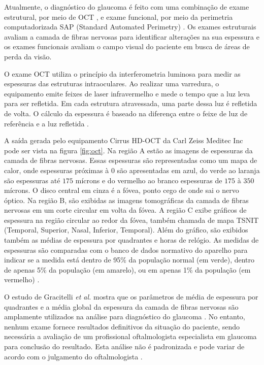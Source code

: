 \documentclass[conference]{IEEEtran}
\begin{document}
Atualmente, o diagnóstico do glaucoma é feito com uma combinação de exame estrutural, por meio de OCT \cite{Wollstein2005}, e exame funcional, por meio da perimetria computadorizada SAP (Standard Automated Perimetry) \cite{chauhan1990}. Os exames estruturais avaliam a camada de fibras nervosas para identificar alterações na sua espessura e os exames funcionais avaliam o campo visual do paciente em busca de áreas de perda da visão. 

O exame OCT utiliza o princípio da interferometria luminosa para medir as espessuras das estruturas intraoculares. Ao realizar uma varredura, o equipamento emite feixes de laser infravermelho e mede o tempo que a luz leva para ser refletida. Em cada estrutura atravessada, uma parte dessa luz é refletida de volta. O cálculo da espessura é baseado na diferença entre o feixe de luz de referência e a luz refletida \cite{huang1991}. 

A saída gerada pelo equipamento Cirrus HD-OCT da Carl Zeiss Meditec Inc \cite{zeiss} pode ser vista na figura \ref{fig:oct}. Na região A estão as imagens de espessuras da camada de fibras nervosas. Essas espessuras são representadas como um mapa de calor, onde espessuras próximas à $0$ são apresentadas em azul, do verde ao laranja são espessuras até $175$ mícrons e do vermelho ao branco espessuras de $175$ à $350$ mícrons. O disco central em cinza é a fóvea, ponto cego de onde sai o nervo óptico. Na região B, são exibidas as imagens tomográficas da camada de fibras nervosas em um corte circular em volta da fóvea. A região C exibe gráficos de espessura na região circular ao redor da fóvea, também chamada de mapa TSNIT (Temporal, Superior, Nasal, Inferior, Temporal). Além do gráfico, são exibidos também as médias de espessura por quadrantes e horas de relógio. As medidas de espessuras são comparadas com o banco de dados normativo do aparelho para indicar se a medida está dentro de 95\% da população normal (em verde), dentro de apenas 5\% da população (em amarelo), ou em apenas 1\% da população (em vermelho) \cite{aref2010}. 

O estudo de Gracitelli \textit{et al.} mostra que os parâmetros de média de espessura por quadrantes e a média global da espessura da camada de fibras nervosas são amplamente utilizados na análise para diagnóstico do glaucoma \cite{Gracitelli2015}. No entanto, nenhum exame fornece resultados definitivos da situação do paciente, sendo necessária a avaliação de um profissional oftalmologista especialista em glaucoma para conclusão do resultado. Esta análise não é padronizada e pode variar de acordo com o julgamento do oftalmologista \cite{kroese2003}. 
\end{document}
